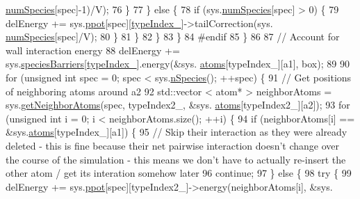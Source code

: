 \begin{DoxyCode}
      \hyperlink{classsim_system_a9eea865e6dc1cff377b1e79c4d9c23f0}{numSpecies}[spec]-1)/V);
76                     \}
77                 \} \textcolor{keywordflow}{else} \{
78                     \textcolor{keywordflow}{if} (sys.\hyperlink{classsim_system_a9eea865e6dc1cff377b1e79c4d9c23f0}{numSpecies}[spec] > 0) \{
79                         delEnergy += sys.\hyperlink{classsim_system_ad2e290b5963f132e6a3a56cee35c8e9f}{ppot}[spec][\hyperlink{classmc_move_acb731965547b0326ef318ec96da8b46a}{typeIndex\_}]->tailCorrection(sys.
      \hyperlink{classsim_system_a9eea865e6dc1cff377b1e79c4d9c23f0}{numSpecies}[spec]/V);
80                     \}
81                 \}
82             \}
83         \}
84 \textcolor{preprocessor}{#endif}
85 \textcolor{preprocessor}{}    \}
86 
87     \textcolor{comment}{// Account for wall interaction energy}
88     delEnergy += sys.\hyperlink{classsim_system_a5ae652ff4519f39c3862abae32a9581b}{speciesBarriers}[\hyperlink{classmc_move_acb731965547b0326ef318ec96da8b46a}{typeIndex\_}].energy(&sys.
      \hyperlink{classsim_system_a90421b19082f7fb8fc23b7264b1161e4}{atoms}[typeIndex\_][a1], box);
89 
90     \textcolor{keywordflow}{for} (\textcolor{keywordtype}{unsigned} \textcolor{keywordtype}{int} spec = 0; spec < sys.\hyperlink{classsim_system_ab5e2e9b6204de15520302fe1d51688dd}{nSpecies}(); ++spec) \{
91         \textcolor{comment}{// Get positions of neighboring atoms around a2}
92         std::vector < atom* > neighborAtoms = sys.\hyperlink{classsim_system_a9b3aeefa22c3b50b5913df6eea753bc6}{getNeighborAtoms}(spec, typeIndex2\_, &sys.
      \hyperlink{classsim_system_a90421b19082f7fb8fc23b7264b1161e4}{atoms}[typeIndex2\_][a2]);
93         \textcolor{keywordflow}{for} (\textcolor{keywordtype}{unsigned} \textcolor{keywordtype}{int} i = 0; i < neighborAtoms.size(); ++i) \{
94             \textcolor{keywordflow}{if} (neighborAtoms[i] == &sys.\hyperlink{classsim_system_a90421b19082f7fb8fc23b7264b1161e4}{atoms}[typeIndex\_][a1]) \{
95                 \textcolor{comment}{// Skip their interaction as they were already deleted - this is fine because their net
       pairwise interaction doesn't change over the course of the simulation - this means we don't have to actually
       re-insert the other atom / get its interation somehow later}
96                 \textcolor{keywordflow}{continue};
97             \} \textcolor{keywordflow}{else} \{
98                 \textcolor{keywordflow}{try} \{
99                     delEnergy += sys.\hyperlink{classsim_system_ad2e290b5963f132e6a3a56cee35c8e9f}{ppot}[spec][typeIndex2\_]->energy(neighborAtoms[i], &sys.

\end{DoxyCode}
